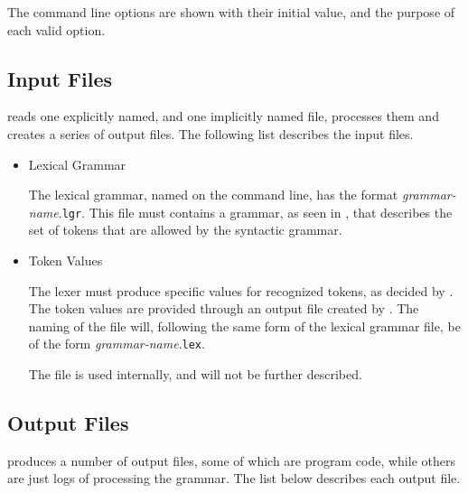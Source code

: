 The command line options are shown with their initial value, and the
purpose of each valid option.

\subsection{Input Files}

\dfae reads one explicitly named, and one implicitly named file,
processes them and creates a series of output files.  The following
list describes the input files.


\begin{itemize}
\item Lexical Grammar

  The lexical grammar, named on the command line, has the format
  \emph{grammar-name}.\texttt{lgr}.  This file must contains a \dfagrm
  grammar, as seen in , that describes the set of
  tokens that are allowed by the syntactic grammar.

\item Token Values

  The lexer must produce specific values for recognized tokens, as
  decided by \lrstare.  The token values are provided through an
  output file created by \lrstare.  The naming of the file will,
  following the same form of the lexical grammar file, be of the form
  \emph{grammar-name}.\texttt{lex}.

  The file is used internally, and will not be further described.
\end{itemize}

\subsection{Output Files}
\dfae produces a number of output files, some of which are program
code, while others are just logs of processing the grammar.  The list
below describes each output file.

